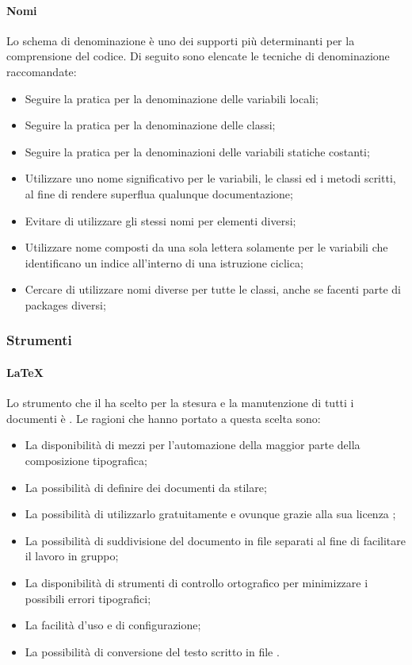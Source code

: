 \paragraph{Nomi}
Lo schema di denominazione è uno dei supporti più determinanti per la comprensione del codice.
Di seguito sono elencate le tecniche di denominazione raccomandate:

\begin{itemize}
\item Seguire la pratica  per la denominazione delle variabili locali;
\item Seguire la pratica  per la denominazione delle classi;
\item Seguire la pratica  per la denominazioni delle variabili statiche costanti;
\item Utilizzare uno nome significativo per le variabili, le classi ed i metodi scritti, al fine di rendere superflua qualunque documentazione;
\item Evitare di utilizzare gli stessi nomi per elementi diversi;
\item Utilizzare nome composti da una sola lettera solamente per le variabili che identificano un indice all'interno di una istruzione ciclica;
\item Cercare di utilizzare nomi diverse per tutte le classi, anche se facenti parte di packages diversi;
\end{itemize}
  


\subsubsection{Strumenti}
\paragraph{LaTeX}
Lo strumento che il  ha scelto per la stesura e la manutenzione di tutti i documenti è . Le ragioni che hanno portato a questa scelta sono:
\begin{itemize}
\item La disponibilità di mezzi per l'automazione della maggior parte della composizione tipografica;
\item La possibilità di definire  dei documenti da stilare;
\item La possibilità di utilizzarlo gratuitamente e ovunque grazie alla sua licenza ;
\item La possibilità di suddivisione del documento in file separati al fine di facilitare il lavoro in gruppo;
\item La disponibilità di strumenti di controllo ortografico per minimizzare i possibili errori tipografici;
\item La facilità d'uso e di configurazione;
\item La possibilità di conversione del testo scritto in file .
\end{itemize}

